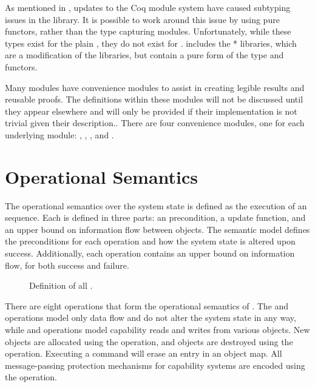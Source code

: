 As mentioned in , updates to the Coq module system have caused subtyping issues in the \COQFMap{} library.
It is possible to work around this issue by using pure functors, rather than the type capturing modules.
Unfortunately, while these types exist for the plain \COQFMap{}, they do not exist for \COQOrderedFMap{}.
\TMmodelName{} includes the \COQFMapTwo{}* libraries, which are a modification of the \COQFMap{} libraries, but contain a pure form of the \COQOrderedFMapFun{} type and functors.

Many modules have convenience modules to assist in creating legible results and reusable proofs.
The definitions within these modules will not be discussed until they appear elsewhere and will only be provided if their implementation is not trivial given their description..
There are four convenience modules, one for each underlying module: \COQCapabilities{}, \COQObjects{}, \COQSystemState{}, and \COQSemantics{}.

\section{Operational Semantics}
\label{sect:embed:semantics}

The operational semantics over the system state is defined as the execution of an \TMop{} sequence.
Each \TMop{} is defined in three parts: an \TMop{} precondition, a \TMsystemState{} update function, and an upper bound on information flow between objects.
The semantic model defines the preconditions for each operation and how the system state is altered upon success.
Additionally, each operation contains an upper bound on information flow, for both success and failure.

\begin{figure}
  \COQDOCoperation{}
  \caption{Definition of all \TMops{}. \label{fig:embed:op}}
\end{figure}

There are eight operations that form the operational semantics of \TMmodelName{}.
The \COQread{} and \COQwrite{} operations model only data flow and do not alter the system state in any way, while \COQfetch{} and \COQstore{} operations model capability reads and writes from various objects.
New objects are allocated using the \COQcreate{} operation, and objects are destroyed using the \COQdestroy{} operation.
Executing a \COQrevoke{} command will erase an entry in an object map.
All message-passing protection mechanisms for capability systems are encoded using the \COQsend{} operation.

